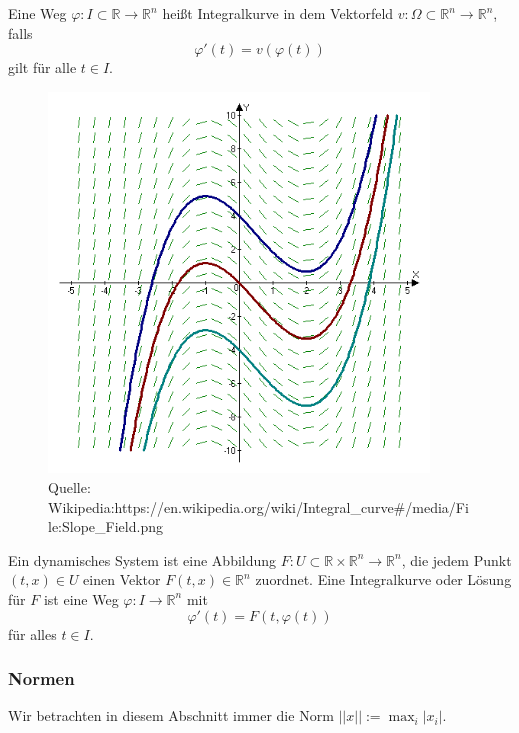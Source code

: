 \begin{Definition}
Eine Weg $\varphi : I \subset \mathbb{R} \to \mathbb{R}^n$ heißt Integralkurve in dem Vektorfeld $v : \Omega \subset \mathbb{R}^n \to \mathbb{R}^n$, falls 
$$\varphi' (t) = v(\varphi(t))$$ gilt für alle $t \in  I$.
\end{Definition}


\begin{figure}[H]
      \centering
    \includegraphics[width=0.9\textwidth]{images/Slope_Field.png}
\caption{Quelle: Wikipedia:https://en.wikipedia.org/wiki/Integral\_curve\#/media/File:Slope\_Field.png}
\end{figure}

\begin{Definition}
Ein dynamisches System ist eine  Abbildung $F : U \subset \mathbb{R} \times \mathbb{R}^n \to \mathbb{R}^n$, die jedem Punkt $(t,x)  \in U$ einen Vektor $F(t,x) \in \mathbb{R}^n$ zuordnet. Eine Integralkurve oder Lösung für $F$ ist eine Weg $\varphi : I \to \mathbb{R}^n$ mit 
$$\varphi'(t) = F(t, \varphi(t)) $$
für alles $t \in I$.
\end{Definition}


\begin{Satz}
\end{Satz}

\subsubsection*{Normen}
Wir betrachten in diesem Abschnitt immer die Norm $|| x || := \max_i | x_i |$. 

